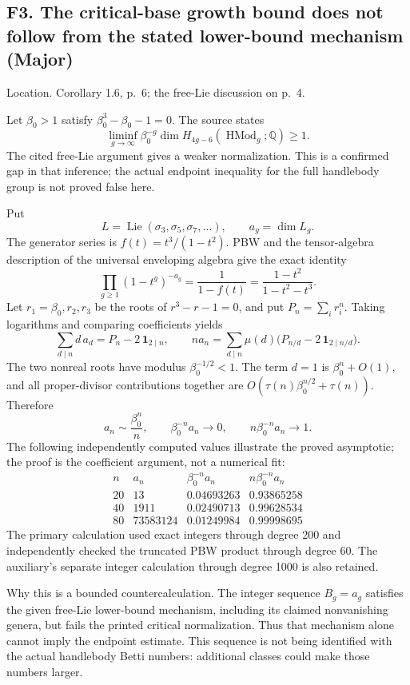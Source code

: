 \documentclass[10pt]{article}
\begin{document}
\subsection*{F3. The critical-base growth bound does not follow from the stated lower-bound mechanism (Major)}
Location. Corollary 1.6, p. 6; the free-Lie discussion on p. 4.\par
Let \(\beta_0>1\) satisfy \(\beta_0^3-\beta_0-1=0\). The source states \[\liminf_{g\to\infty}\beta_0^{-g}
       \dim H_{4g-6}(\operatorname{HMod}_g;\mathbb Q)\ge1.\] The cited free-Lie argument gives a weaker normalization. This is a confirmed gap in that inference; the actual endpoint inequality for the full handlebody group is not proved false here.\par
Put \[L=\operatorname{Lie}(\sigma_3,\sigma_5,\sigma_7,\ldots),\qquad
 a_g=\dim L_g.\] The generator series is \(f(t)=t^3/(1-t^2)\). PBW and the tensor-algebra description of the universal enveloping algebra give the exact identity \[\prod_{g\ge1}(1-t^g)^{-a_g}
       =\frac1{1-f(t)}
       =\frac{1-t^2}{1-t^2-t^3}.\] Let \(r_1=\beta_0,r_2,r_3\) be the roots of \(r^3-r-1=0\), and put \(P_n=\sum_i r_i^n\). Taking logarithms and comparing coefficients yields \[\sum_{d\mid n}d\,a_d=P_n-2\,\mathbf1_{2\mid n},
 \qquad
 n a_n=\sum_{d\mid n}\mu(d)
    \bigl(P_{n/d}-2\,\mathbf1_{2\mid n/d}\bigr).\] The two nonreal roots have modulus \(\beta_0^{-1/2}<1\). The term \(d=1\) is \(\beta_0^n+O(1)\), and all proper-divisor contributions together are \(O(\tau(n)\beta_0^{n/2}+\tau(n))\). Therefore \[a_n\sim\frac{\beta_0^n}{n},\qquad
 \beta_0^{-n}a_n\longrightarrow0,\qquad
 n\beta_0^{-n}a_n\longrightarrow1.\] The following independently computed values illustrate the proved asymptotic; the proof is the coefficient argument, not a numerical fit: \[\begin{array}{r|r|c|c}
 n&a_n&\beta_0^{-n}a_n&n\beta_0^{-n}a_n\\ \hline
 20&13&0.04693263&0.93865258\\
 40&1911&0.02490713&0.99628534\\
 80&73583124&0.01249984&0.99998695
 \end{array}\] The primary calculation used exact integers through degree 200 and independently checked the truncated PBW product through degree 60. The auxiliary’s separate integer calculation through degree 1000 is also retained.\par
Why this is a bounded countercalculation. The integer sequence \(B_g=a_g\) satisfies the given free-Lie lower-bound mechanism, including its claimed nonvanishing genera, but fails the printed critical normalization. Thus that mechanism alone cannot imply the endpoint estimate. This sequence is not being identified with the actual handlebody Betti numbers: additional classes could make those numbers larger.\par
\end{document}
